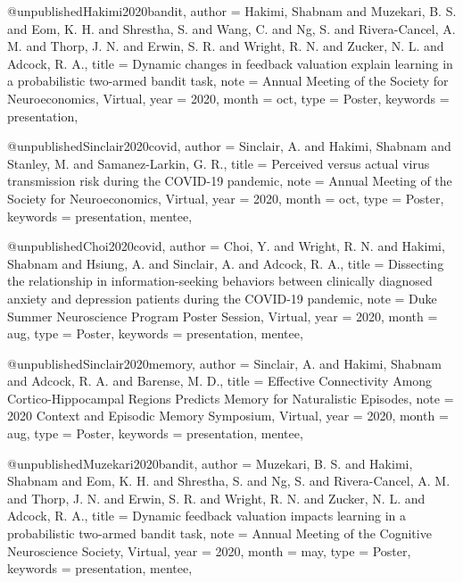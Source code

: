 @unpublished{Hakimi2020bandit,
  author   = {Hakimi, Shabnam and Muzekari, B. S. and Eom, K. H.
              and Shrestha, S. and Wang, C. and Ng, S.
              and Rivera-Cancel, A. M. and Thorp, J. N. and Erwin, S. R.
              and Wright, R. N. and Zucker, N. L. and Adcock, R. A.},
  title    = {Dynamic changes in feedback valuation explain learning in a
              probabilistic two-armed bandit task},
  note     = {Annual Meeting of the Society for Neuroeconomics, Virtual},
  year     = {2020},
  month    = oct,
  type     = {Poster},
  keywords = {presentation},
}

@unpublished{Sinclair2020covid,
  author   = {Sinclair, A. and Hakimi, Shabnam and Stanley, M.
              and Samanez-Larkin, G. R.},
  title    = {Perceived versus actual virus transmission risk during the
              {COVID-19} pandemic},
  note     = {Annual Meeting of the Society for Neuroeconomics, Virtual},
  year     = {2020},
  month    = oct,
  type     = {Poster},
  keywords = {presentation, mentee},
}

@unpublished{Choi2020covid,
  author   = {Choi, Y. and Wright, R. N. and Hakimi, Shabnam
              and Hsiung, A. and Sinclair, A. and Adcock, R. A.},
  title    = {Dissecting the relationship in information-seeking behaviors
              between clinically diagnosed anxiety and depression patients
              during the {COVID-19} pandemic},
  note     = {Duke Summer Neuroscience Program Poster Session, Virtual},
  year     = {2020},
  month    = aug,
  type     = {Poster},
  keywords = {presentation, mentee},
}

@unpublished{Sinclair2020memory,
  author   = {Sinclair, A. and Hakimi, Shabnam and Adcock, R. A.
              and Barense, M. D.},
  title    = {Effective Connectivity Among Cortico-Hippocampal Regions
              Predicts Memory for Naturalistic Episodes},
  note     = {2020 Context and Episodic Memory Symposium, Virtual},
  year     = {2020},
  month    = aug,
  type     = {Poster},
  keywords = {presentation, mentee},
}

@unpublished{Muzekari2020bandit,
  author   = {Muzekari, B. S. and Hakimi, Shabnam and Eom, K. H.
              and Shrestha, S. and Ng, S. and Rivera-Cancel, A. M.
              and Thorp, J. N. and Erwin, S. R. and Wright, R. N.
              and Zucker, N. L. and Adcock, R. A.},
  title    = {Dynamic feedback valuation impacts learning in a probabilistic
              two-armed bandit task},
  note     = {Annual Meeting of the Cognitive Neuroscience Society, Virtual},
  year     = {2020},
  month    = may,
  type     = {Poster},
  keywords = {presentation, mentee},
}

